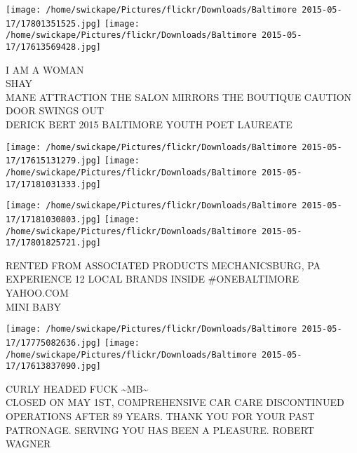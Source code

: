 \documentclass[10pt,letterpaper]{article}
\begin{document}
\texttt{[image: /home/swickape/Pictures/flickr/Downloads/Baltimore 2015-05-17/17801351525.jpg]}
\texttt{[image: /home/swickape/Pictures/flickr/Downloads/Baltimore 2015-05-17/17613569428.jpg]}

I AM A WOMAN\\
SHAY\\
MANE ATTRACTION THE SALON MIRRORS THE BOUTIQUE CAUTION DOOR SWINGS OUT\\
DERICK BERT 2015 BALTIMORE YOUTH POET LAUREATE
\pagebreak

\texttt{[image: /home/swickape/Pictures/flickr/Downloads/Baltimore 2015-05-17/17615131279.jpg]}
\texttt{[image: /home/swickape/Pictures/flickr/Downloads/Baltimore 2015-05-17/17181031333.jpg]}

\texttt{[image: /home/swickape/Pictures/flickr/Downloads/Baltimore 2015-05-17/17181030803.jpg]}
\texttt{[image: /home/swickape/Pictures/flickr/Downloads/Baltimore 2015-05-17/17801825721.jpg]}

RENTED FROM ASSOCIATED PRODUCTS MECHANICSBURG, PA\\
EXPERIENCE 12 LOCAL BRANDS INSIDE \#ONEBALTIMORE\\
YAHOO.COM\\
MINI BABY
\pagebreak

\texttt{[image: /home/swickape/Pictures/flickr/Downloads/Baltimore 2015-05-17/17775082636.jpg]}
\texttt{[image: /home/swickape/Pictures/flickr/Downloads/Baltimore 2015-05-17/17613837090.jpg]}

CURLY HEADED FUCK \textasciitilde{}MB\textasciitilde{}\\
CLOSED ON MAY 1ST, COMPREHENSIVE CAR CARE DISCONTINUED OPERATIONS AFTER 89 YEARS.  THANK YOU FOR YOUR PAST PATRONAGE.  SERVING YOU HAS BEEN A PLEASURE.  ROBERT WAGNER
\pagebreak
\end{document}
